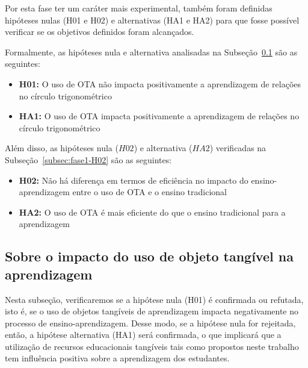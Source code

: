 

Por esta fase ter um caráter mais experimental, também foram definidas hipóteses nulas (H01 e H02) e alternativas (HA1 e HA2) para que fosse possível verificar se os objetivos definidos foram alcançados.

Formalmente, as hipóteses nula e alternativa analisadas na Subseção~\ref{subsec:fase1-H01} são as seguintes:
\begin{itemize}
	\item \textbf{H01:} O uso de OTA não impacta positivamente a aprendizagem de relações no círculo trigonométrico
	\item \textbf{HA1:} O uso de OTA impacta positivamente a aprendizagem de relações no círculo trigonométrico
\end{itemize}

Além disso, as hipóteses nula ($H02$) e alternativa ($HA2$) verificadas na Subseção~\ref{subsec:fase1-H02} são as seguintes:
\begin{itemize}
	\item \textbf{H02:}  Não há diferença em termos de eficiência no impacto do ensino-aprendizagem entre o uso de OTA e o ensino tradicional
	\item \textbf{HA2:} O uso de OTA é mais eficiente do que o ensino tradicional para a aprendizagem
\end{itemize}


\subsection{Sobre o impacto do uso de objeto tangível na aprendizagem}\label{subsec:fase1-H01}

Nesta subseção, verificaremos se a hipótese nula (H01) é confirmada ou refutada, isto é, se o uso de objetos tangíveis de aprendizagem impacta negativamente no processo de ensino-aprendizagem. Desse modo, se a hipótese nula for rejeitada, então, a hipótese alternativa (HA1) será confirmada, o que implicará que a utilização de recursos educacionais tangíveis tais como propostos neste trabalho tem influência positiva sobre a aprendizagem dos estudantes.

